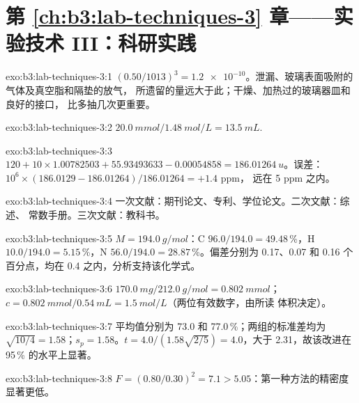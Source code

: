 \section*{第 \ref{ch:b3:lab-techniques-3} 章——实验技术 III：科研实践}

\begin{solution}{exo:b3:lab-techniques-3:1}
$(0.50/1013)^3 = \num{1.2e-10}$。泄漏、玻璃表面吸附的气体及真空脂和隔垫的放气，
所遗留的量远大于此；干燥、加热过的玻璃器皿和良好的接口，
比多抽几次更重要。
\end{solution}

\begin{solution}{exo:b3:lab-techniques-3:2}
$\qty{20.0}{mmol}/\qty{1.48}{mol/L} = \qty{13.5}{mL}$.
\end{solution}

\begin{solution}{exo:b3:lab-techniques-3:3}
$120 + 10 \times 1.00782503 + 55.93493633 - 0.00054858 = \qty{186.01264}{u}$。误差：$10^6 \times (186.0129 - 186.01264)/186.01264 = +1.4$ ppm，
远在 5 ppm 之内。
\end{solution}

\begin{solution}{exo:b3:lab-techniques-3:4}
一次文献：期刊论文、专利、学位论文。二次文献：综述、
常数手册。三次文献：教科书。
\end{solution}

\begin{solution}{exo:b3:lab-techniques-3:5}
$M = \qty{194.0}{g/mol}$：C $96.0/194.0 = 49.48$\,\%，H $10.0/194.0 = 5.15$\,\%，N $56.0/194.0 = 28.87$\,\%。偏差分别为 0.17、0.07 和 0.16
个百分点，均在 0.4 之内，分析支持该化学式。
\end{solution}

\begin{solution}{exo:b3:lab-techniques-3:6}
$\qty{170.0}{mg}/\qty{212.0}{g/mol} = \qty{0.802}{mmol}$；$c = \qty{0.802}{mmol}/\qty{0.54}{mL} = \qty{1.5}{mol/L}$（两位有效数字，由所读
体积决定）。
\end{solution}

\begin{solution}{exo:b3:lab-techniques-3:7}
平均值分别为 73.0 和 77.0\,\%；两组的标准差均为 $\sqrt{10/4} = 1.58$；$s_p = 1.58$。$t = 4.0/(1.58\sqrt{2/5}) = 4.0$，大于
2.31，故该改进在 95\,\% 的水平上显著。
\end{solution}

\begin{solution}{exo:b3:lab-techniques-3:8}
$F = (0.80/0.30)^2 = 7.1 > 5.05$：第一种方法的精密度显著更低。
\end{solution}

